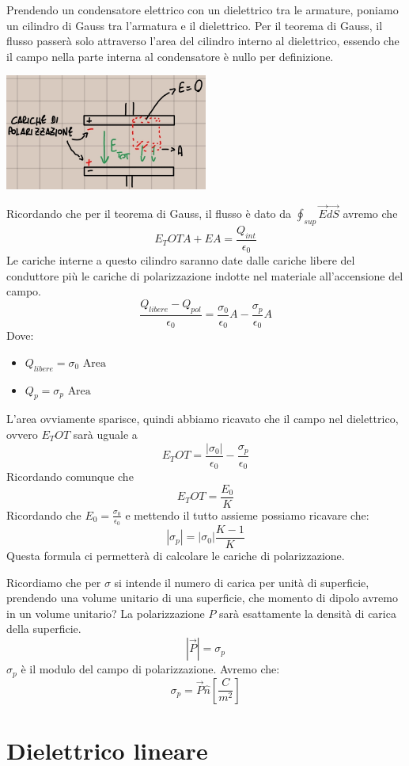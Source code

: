\documentclass[a4paper, 12pt]{book}
\theoremstyle{plain}
\begin{document}
Prendendo un condensatore elettrico con un dielettrico tra le armature, poniamo un cilindro di Gauss tra l'armatura e il 
dielettrico. Per il teorema di Gauss, il flusso passerà solo attraverso l'area del cilindro interno al dielettrico, essendo che il campo 
nella parte interna al condensatore è nullo per definizione.
\begin{center}
    \includegraphics[width=0.5\textwidth]{cond_diel_campo.jpg}
\end{center}
Ricordando che per il teorema di Gauss, il flusso è dato da $\oint_{sup} \vec{E} \vec{dS}$ avremo che 
\[
    E_TOT A + EA = \frac{Q_{int}}{\epsilon_0}
\]
Le cariche interne a questo cilindro saranno date dalle cariche libere del conduttore più le cariche di polarizzazione indotte 
nel materiale all'accensione del campo.
\[
    \frac{Q_{libere} - Q_{pol}}{\epsilon_0} = \frac{\sigma_0}{\epsilon_0} A - \frac{\sigma_p}{\epsilon_0} A
\]
Dove:
\begin{itemize}
    \item $Q_{libere} = \sigma_0 \textrm{ Area}$
    \item $Q_p = \sigma_p \textrm{ Area}$
\end{itemize}
L'area ovviamente sparisce, quindi abbiamo ricavato che il campo nel dielettrico, ovvero $E_TOT$ sarà uguale a 
\[
    E_TOT = \frac{|\sigma_0|}{\epsilon_0} - \frac{\sigma_p}{\epsilon_0}
\]
Ricordando comunque che 
\[
    E_TOT = \frac{E_0}{K}
\]
Ricordando che $E_0 = \frac{\sigma_0}{\epsilon_0}$ e mettendo il tutto assieme possiamo ricavare che:
\[
    |\sigma_p| = |\sigma_0| \frac{K - 1}{K}
\]
Questa formula ci permetterà di calcolare le cariche di polarizzazione.

Ricordiamo che per $\sigma$ si intende il numero di carica per unità di superficie, prendendo una volume unitario di una superficie,
 che momento di dipolo avremo in un volume unitario? La polarizzazione $P$ sarà esattamente la densità di carica della superficie. 
\[
    |\vec{P}| = \sigma_p
\]
$\sigma_p$ è il modulo del campo di polarizzazione. Avremo che:
\[
    \sigma_p = \vec{P} \hat{n} [\frac{C}{m^2}]
\]

\section{Dielettrico lineare}
\end{document}
